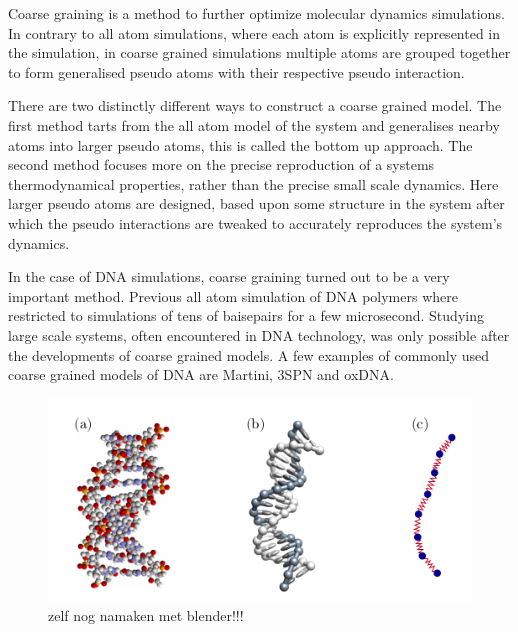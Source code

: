 Coarse graining is a method to further optimize molecular dynamics simulations.
In contrary to all atom simulations, where each atom is explicitly represented in the
simulation, in coarse grained simulations multiple atoms are grouped together to form
generalised pseudo atoms with their respective pseudo interaction.

There are two distinctly different ways to construct a coarse grained model. The first
method tarts from the all atom model of the system and generalises nearby atoms into
larger pseudo atoms, this is called the bottom up approach. The second method focuses
more on the precise reproduction of a systems thermodynamical properties, rather than
the precise small scale dynamics. Here larger pseudo atoms are designed, based upon some
structure in the system after which the pseudo interactions are tweaked to accurately
reproduces the system's dynamics.

In the case of DNA simulations, coarse graining turned out to be a very important method.
Previous all atom simulation of DNA polymers where restricted to simulations of tens of
baisepairs for a few microsecond. Studying large scale systems, often encountered in DNA
technology, was only possible after the developments of coarse grained models.
A few examples of commonly used coarse grained models of DNA are Martini, 3SPN and
oxDNA.

\begin{figure}[htpb]
    \centering
    \includegraphics[width=0.6\linewidth]{Figures/CoarseGrained.png}
    \caption{zelf nog namaken met blender!!!}%
    \label{fig:Figures/CoarseGrained}
\end{figure}
